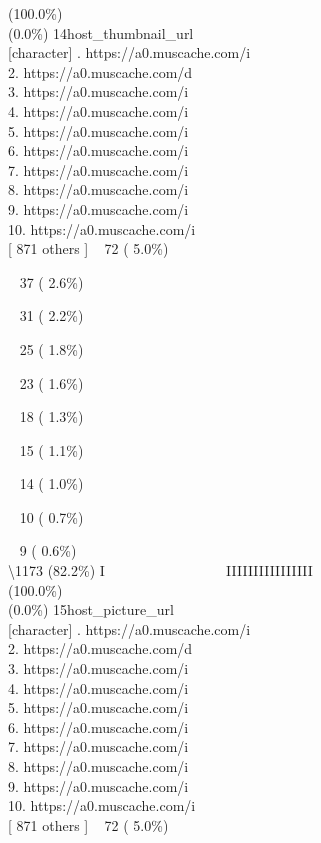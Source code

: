 \documentclass[
  journal,
]{IEEEtran}%
\begin{document}
(100.0\%) \\
(0.0\%) \textbar{} \textbar{} 14\textbar host\_thumbnail\_url\\
{[}character{]} . https://a0.muscache.com/i\\
2. https://a0.muscache.com/d\\
3. https://a0.muscache.com/i\\
4. https://a0.muscache.com/i\\
5. https://a0.muscache.com/i\\
6. https://a0.muscache.com/i\\
7. https://a0.muscache.com/i\\
8. https://a0.muscache.com/i\\
9. https://a0.muscache.com/i\\
10. https://a0.muscache.com/i\\
{[} 871 others {]} \textbar~ 72 ( 5.0\%)\\
\strut ~ 37 ( 2.6\%)\\
\strut ~ 31 ( 2.2\%)\\
\strut ~ 25 ( 1.8\%)\\
\strut ~ 23 ( 1.6\%)\\
\strut ~ 18 ( 1.3\%)\\
\strut ~ 15 ( 1.1\%)\\
\strut ~ 14 ( 1.0\%)\\
\strut ~ 10 ( 0.7\%)\\
\strut ~ 9 ( 0.6\%)\\
\textbackslash1173 (82.2\%) \textbar{} \textbar I ~ ~ ~ ~ ~ ~ ~ ~ ~ ~
IIIIIIIIIIIIIIII \\
(100.0\%) \\
(0.0\%) \textbar{} \textbar{} 15\textbar host\_picture\_url\\
{[}character{]} . https://a0.muscache.com/i\\
2. https://a0.muscache.com/d\\
3. https://a0.muscache.com/i\\
4. https://a0.muscache.com/i\\
5. https://a0.muscache.com/i\\
6. https://a0.muscache.com/i\\
7. https://a0.muscache.com/i\\
8. https://a0.muscache.com/i\\
9. https://a0.muscache.com/i\\
10. https://a0.muscache.com/i\\
{[} 871 others {]} \textbar~ 72 ( 5.0\%)\\
\end{document}
